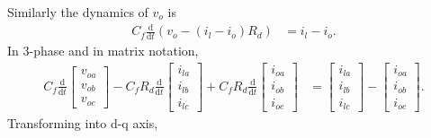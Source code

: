 Similarly the dynamics of $v_o$ is
\begin{align*}
	C_f\frac{\text{d}}{\text{d}t}(v_o-(i_l-i_o)R_d) &= i_l-i_o.
\end{align*}
In 3-phase and in matrix notation,
\begin{align*}
	C_f\frac{\text{d}}{\text{d}t}\begin{bmatrix}
		v_{oa}\\v_{ob}\\v_{oc}
	\end{bmatrix}-C_fR_d\frac{\text{d}}{\text{d}t}\begin{bmatrix}
		i_{la}\\i_{lb}\\i_{lc}
	\end{bmatrix}+C_fR_d\frac{\text{d}}{\text{d}t}\begin{bmatrix}
		i_{oa}\\i_{ob}\\i_{oc}
	\end{bmatrix} &= \begin{bmatrix}
		i_{la}\\i_{lb}\\i_{lc}
	\end{bmatrix}-\begin{bmatrix}
		i_{oa}\\i_{ob}\\i_{oc}
	\end{bmatrix}.
\end{align*}
Transforming into d-q axis,
